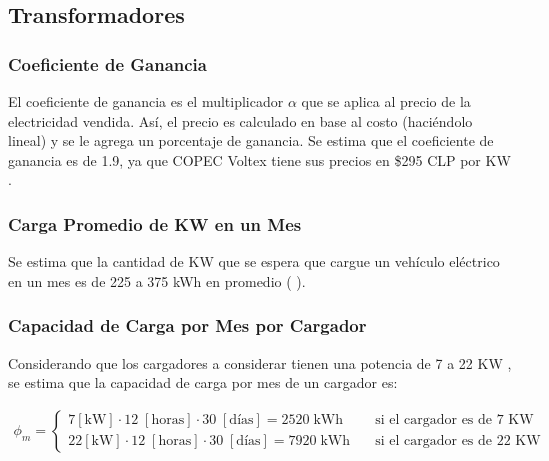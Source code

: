 \documentclass[letterpaper]{article}
\begin{document}
\begin{flushleft}
	\subsection{Transformadores}

	\subsubsection{Coeficiente de Ganancia}

	El coeficiente de ganancia es el multiplicador $\alpha$ que se aplica al precio de la electricidad vendida. Así, el precio es calculado en base al costo (haciéndolo lineal) y se le agrega un porcentaje de ganancia. Se estima que el coeficiente de ganancia es de 1.9, ya que COPEC Voltex tiene sus precios en \$295 CLP por KW \cite{copec}.

	\subsubsection{Carga Promedio de KW en un Mes}


	Se estima que la cantidad de KW que se espera que cargue un vehículo eléctrico en un mes es de 225 a 375 kWh en promedio (\cite{delta1} \cite{delta2} \cite{delta3}). 

	\subsubsection{Capacidad de Carga por Mes por Cargador}

	Considerando que los cargadores a considerar tienen una potencia de 7 a 22 KW \cite{cargadores}, se estima que la capacidad de carga por mes de un cargador es:

	\begin{align*}
		\phi_m =
		\begin{cases}
			7 [\text{kW}] \cdot 12\; [\text{horas}] \cdot  30 \;[\text{días}] = 2520 \; \text{kWh}& \quad\text{si el cargador es de 7 KW} \\
			22 [\text{kW}] \cdot 12\; [\text{horas}] \cdot  30 \;[\text{días}] = 7920 \;\text{kWh}& \quad\text{si el cargador es de 22 KW}
		\end{cases}
	\end{align*}


\end{flushleft}
\end{document}

